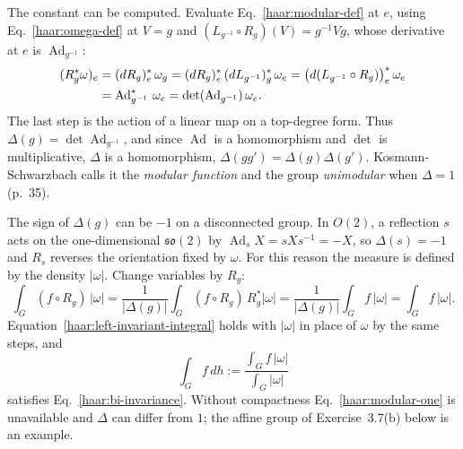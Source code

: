 The constant can be computed. Evaluate Eq.~\eqref{haar:modular-def} at $e$,
using Eq.~\eqref{haar:omega-def} at $V=g$ and
$(L_{g^{-1}}\circ R_g)(V)=g^{-1}Vg$, whose derivative at $e$ is
$\operatorname{Ad}_{g^{-1}}$:
\begin{align}
 (R_g^*\omega)_e&=(dR_g)_e^*\,\omega_g
 =(dR_g)_e^*\,(dL_{g^{-1}})_g^*\,\omega_e
 =\big(d(L_{g^{-1}}\circ R_g)\big)_e^*\,\omega_e\notag\\
 &=\operatorname{Ad}_{g^{-1}}^*\,\omega_e
 =\det(\operatorname{Ad}_{g^{-1}})\,\omega_e .\label{haar:modular}
\end{align}
The last step is the action of a linear map on a top-degree form. Thus
$\Delta(g)=\det\operatorname{Ad}_{g^{-1}}$, and since $\operatorname{Ad}$ is
a homomorphism and $\det$ is multiplicative, $\Delta$ is a homomorphism,
$\Delta(gg')=\Delta(g)\Delta(g')$. Kosmann-Schwarzbach calls it the
\emph{modular function} and the group \emph{unimodular} when $\Delta=1$
(p.~35).

The sign of $\Delta(g)$ can be $-1$ on a disconnected group. In $O(2)$, a
reflection $s$ acts on the one-dimensional $\mathfrak{so}(2)$ by
$\operatorname{Ad}_sX=sXs^{-1}=-X$, so $\Delta(s)=-1$ and $R_s$ reverses the
orientation fixed by $\omega$. For this reason the measure is defined by the
density $|\omega|$. Change variables by $R_g$:
\begin{equation}\label{haar:right-invariant-integral}
 \int_G(f\circ R_g)\,|\omega|
 =\frac1{|\Delta(g)|}\int_G(f\circ R_g)\,R_g^*|\omega|
 =\frac1{|\Delta(g)|}\int_Gf\,|\omega|
 =\int_Gf\,|\omega| .
\end{equation}
Equation~\eqref{haar:left-invariant-integral} holds with $|\omega|$ in place
of $\omega$ by the same steps, and
\begin{equation}\label{haar:normalized}
 \int_Gf\,dh:=\frac{\int_Gf\,|\omega|}{\int_G|\omega|}
\end{equation}
satisfies Eq.~\eqref{haar:bi-invariance}. Without compactness
Eq.~\eqref{haar:modular-one} is unavailable and $\Delta$ can differ from
$1$; the affine group of Exercise~3.7(b) below is an example.


